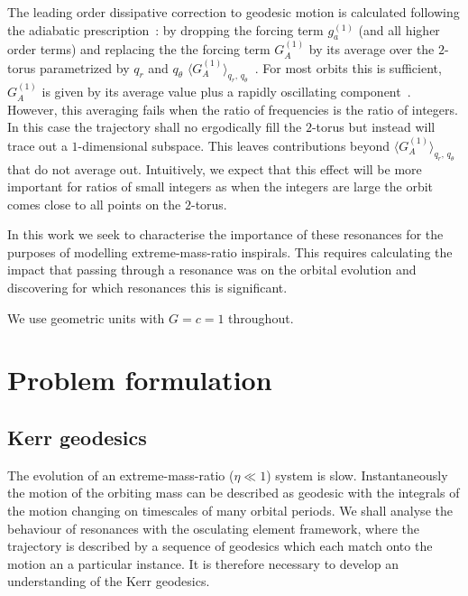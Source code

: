 \documentclass[aps,prd,amsfonts,amssymb,amsmath,nofootinbib,reprint,showpacs]{revtex4-1}
\begin{document}
The leading order dissipative correction to geodesic motion is calculated following the adiabatic prescription~\cite{Hinderer2008}: by dropping the forcing term $g_a^{(1)}$ (and all higher order terms) and replacing the the forcing term $G_A^{(1)}$ by its average over the $2$-torus parametrized by $q_r$ and $q_\theta$ $\langle G_A^{(1)}\rangle_{q_r,\,q_\theta}$~\cite{Drasco2005}. For most orbits this is sufficient, $G_A^{(1)}$ is given by its average value plus a rapidly oscillating component~\cite{Arnold1988}. %
However, this averaging fails when the ratio of frequencies is the ratio of integers. In this case the trajectory shall no ergodically fill the $2$-torus but instead will trace out a $1$-dimensional subspace. This leaves contributions beyond $\langle G_A^{(1)}\rangle_{q_r,\,q_\theta}$ that do not average out. Intuitively, we expect that this effect will be more important for ratios of small integers as when the integers are large the orbit comes close to all points on the $2$-torus.

In this work we seek to characterise the importance of these resonances for the purposes of modelling extreme-mass-ratio inspirals. This requires calculating the impact that passing through a resonance was on the orbital evolution and discovering for which resonances this is significant.

We use geometric units with $G = c = 1$ throughout.

\section{Problem formulation}

\subsection{Kerr geodesics}

The evolution of an extreme-mass-ratio ($\eta \ll 1$) system is slow. Instantaneously the motion of the orbiting mass can be described as geodesic with the integrals of the motion changing on timescales of many orbital periods. We shall analyse the behaviour of resonances with the osculating element framework, where the trajectory is described by a sequence of geodesics which each match onto the motion an a particular instance. It is therefore necessary to develop an understanding of the Kerr geodesics.
\end{document}
